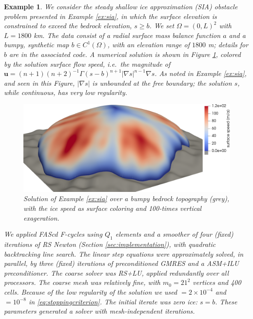 \documentclass[letterpaper,final,12pt,reqno]{amsart}
\theoremstyle{cstyle}
\theoremstyle{cstyle*}
\theoremstyle{dstyle}
\newtheorem{example}[theorem]{Example}
\numberwithin{equation}{section}
\numberwithin{figure}{section}
\numberwithin{table}{section}
\numberwithin{theorem}{section}
\newcommand{\grad}{\nabla}
\begin{document}
\begin{example}   \label{ex:results:sia}
We consider the steady shallow ice approximation (SIA) obstacle problem presented in Example \ref{ex:sia}, in which the surface elevation is constrained to exceed the bedrock elevation, $s\ge b$.  We set $\Omega=(0,L)^2$ with $L=1800$ km.  The data consist of a radial surface mass balance function $a$ \cite[equation (5.122)]{GreveBlatter2009} and a bumpy, synthetic map $b\in C^1(\Omega)$, with an elevation range of $1800$ m; details for $b$ are in the associated code.  A numerical solution is shown in Figure \ref{fig:results:siascene}, colored by the solution surface flow speed, i.e.~the magnitude of $\mathbf{u} = (n+1)(n+2)^{-1} \Gamma (s-b)^{n+1} |\grad s|^{n-1} \grad s$.  As noted in Example \ref{ex:sia}, and seen in this Figure, $|\grad s|$ is unbounded at the free boundary; the solution $s$, while continuous, has very low regularity.

\begin{figure}[ht]
\begin{center}
\includegraphics[width=1.0\textwidth]{fixfigs/sialev8scene.png}
\end{center}
\caption{Solution of Example \ref{ex:sia} over a bumpy bedrock topography (grey), with the ice speed as surface coloring and 100-times vertical exageration.}
\label{fig:results:siascene}
\end{figure}

We applied FAScd F-cycles using $Q_1$ elements and a smoother of four (fixed) iterations of RS Newton (Section \ref{sec:implementation}), with quadratic backtracking line search.  The linear step equations were approximately solved, in parallel, by three (fixed) iterations of preconditioned GMRES and a ASM+ILU preconditioner.  The coarse solver was RS+LU, applied redundantly over all processors.  The coarse mesh was relatively fine, with $m_0=21^2$ vertices and 400 cells.  Because of the low regularity of the solution we used  $= 2 \times 10^{-4}$ and  $= 10^{-8}$ in \eqref{eq:stoppingcriterion}.  The initial iterate was zero ice: $s=b$.  These parameters generated a solver with mesh-independent iterations.  


\end{example}
\end{document}
